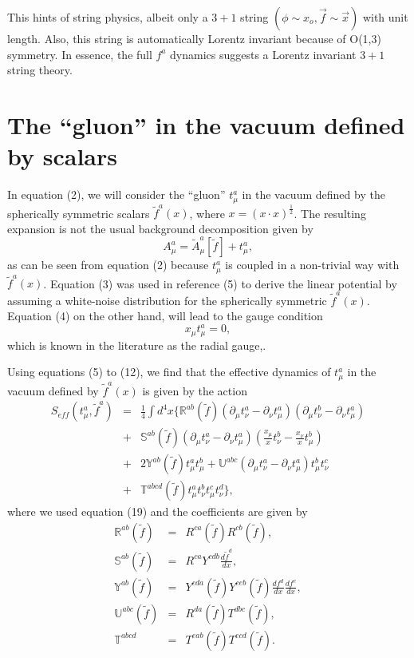 \documentclass[a4paper,12pt]{article}
\begin{document}
This hints of string physics, albeit only a $3+1$ string $(\phi \sim x_{o}, \vec{f}\sim\vec{x})$ with unit length.  Also, this string is automatically Lorentz invariant because of O(1,3) symmetry.  In essence, the full $f^{a}$ dynamics suggests a Lorentz invariant $3+1$ string theory.

\section{The ``gluon'' in the vacuum defined by scalars}

In equation (2), we will consider the ``gluon'' $t^{a}_{\mu}$ in the vacuum defined by the spherically symmetric scalars $\tilde{f}^{a}(x)$, where $x=(x\cdot x)^{\frac{1}{2}}$.  The resulting expansion is not the usual background decomposition given by
\begin{equation}\label{12}
A^{a}_{\mu} = \tilde{A}^{a}_{\mu}[\tilde{f}]+t^{a}_{\mu},
\end{equation}
as can be seen from equation (2) because $t^{a}_{\mu}$ is coupled in a non-trivial way with $\tilde{f}^{a}(x)$.  Equation (3) was used in reference (5) to derive the linear potential by assuming a white-noise distribution for the spherically symmetric $\tilde{f}^{a}(x)$.  Equation (4) on the other hand, will lead to the gauge condition
\begin{equation}\label{13}
x_{\mu}t^{a}_{\mu} = 0,
\end{equation}
which is known in the literature as the radial gauge\cite{linear},\cite{string}.

Using equations (5) to (12), we find that the effective dynamics of $t^{a}_{\mu}$ in the vacuum defined by $\tilde{f}^{a}(x)$ is given by the action
\begin{eqnarray}\label{13}
S_{eff}(t^{a}_{\mu}, \tilde{f}^{a}) &=&\frac{1}{4}\int d^{4}x\{\mathbb{R}^{ab}(\tilde{f})(\partial_{\mu}t^{a}_{\nu}-\partial_{\nu}t^{a}_{\mu})(\partial_{\mu}t^{b}_{\nu}-\partial_{\nu}t^{a}_{\mu})\nonumber\\
&+& \mathbb{S}^{ab}(\tilde{f})(\partial_{\mu}t^{a}_{\nu}-\partial_{\nu}t^{a}_{\mu})(\frac{x_{\mu}}{x}t^{b}_{\nu}-\frac{x_{\nu}}{x}t^{b}_{\mu})\nonumber\\
&+&2\mathbb{Y}^{ab}(\tilde{f})t^{a}_{\mu}t^{b}_{\mu}+\mathcal{\mathbb{U}}^{abc}(\partial_{\mu}t^{a}_{\nu}-\partial_{\nu}t^{a}_{\mu})t^{b}_{\mu}t^{c}_{\nu}\nonumber\\
&+&\mathbb{T}^{abcd}(\tilde{f})t^{a}_{\mu}t^{b}_{\nu}t^{c}_{\mu}t^{d}_{\nu}\},
\end{eqnarray}
where we used equation (19) and the coefficients are given by
\begin{eqnarray}\label{14}
\mathbb{R}^{ab}(\tilde{f}) &=& R^{ca}(\tilde{f})R^{cb}(\tilde{f}),\\
\mathbb{S}^{ab}(\tilde{f}) &=& R^{ca}Y^{cdb}\frac{d\tilde{f}^{d}}{dx},\\
\mathbb{Y}^{ab}(\tilde{f}) &=& Y^{cda}(\tilde{f})Y^{ceb}(\tilde{f})\frac{df^{d}}{dx}\frac{df^{e}}{dx},\\
\mathbb{U}^{abc}(\tilde{f}) &=& R^{da}(\tilde{f})T^{dbc}(\tilde{f}),\\
\mathbb{T}^{abcd} &=& T^{eab}(\tilde{f})T^{ecd}(\tilde{f}).
\end{eqnarray}
\end{document}
